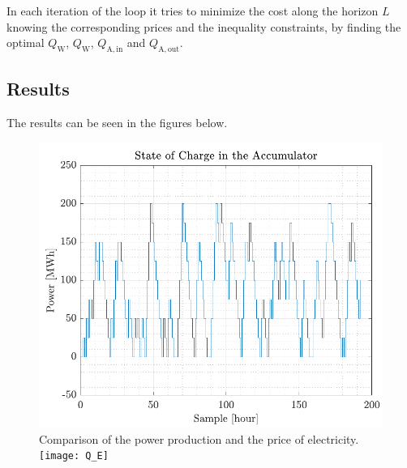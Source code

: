 In each iteration of the loop it tries to minimize the cost along the horizon $L$ knowing the corresponding prices and the inequality constraints, by finding the optimal $Q_\mathrm{W}$, $Q_\mathrm{W}$, $Q_\mathrm{A,in}$ and $Q_\mathrm{A,out}$.

\subsection*{Results}
The results can be seen in the figures below.
\begin{figure}[H]
    \captionbox 
    {
        \label{fig:E_A}                                  
    }                                                                 
    {                                                                 
        \includegraphics[height=.37\textwidth]{figures/E_A}
    }                                                                    
    \hspace{5pt}                                                          
    \captionbox  
    {        
        Comparison of the power production and the price of electricity.    
        \label{fig:Q_E}                                    
    }                                                                     
    {   
        \texttt{[image: Q\_E]}            
    }                                                                             
\end{figure}
